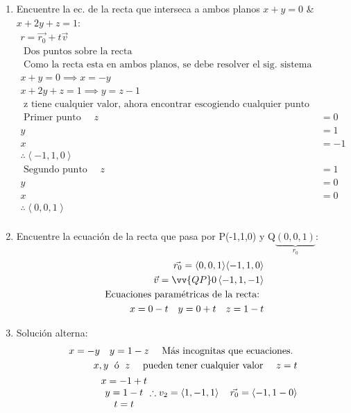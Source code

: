 \documentclass{article}
\begin{document}
\begin{enumerate}
    \item Encuentre la ec. de la recta que interseca a ambos planos $x+y=0$ \& $x+2y+z=1$: 
        \begin{align*}
            r = \vec{r_0} + t \vec{v} \\ 
            \text{  Dos puntos sobre la recta  } \\ 
            \text{  Como la recta esta en ambos planos, se debe resolver el sig. sistema de ecuaciones  } \\ 
            x + y = 0 \implies x=-y \\ 
            x+2y+z=1 \implies y = z-1 \\ 
            \text{  z tiene cualquier valor, ahora encontrar escogiendo cualquier punto sobre la recta, en este caso 0   } \\ 
            \text{  Primer punto   } \quad z & = 0 \\
            y &= 1\\ 
            x & = -1 \\ 
            \therefore \left\langle -1,1,0 \right\rangle \\ 
            \text{  Segundo punto  } \quad z &= 1 \\ 
            y & = 0 \\ 
            x & = 0 \\ 
            \therefore \left\langle 0,0,1 \right\rangle \\ 
        \end{align*}
    
    \item Encuentre la ecuación de la recta que pasa por P(-1,1,0) y Q$\underbrace{(0,0,1)}_{r_0}$:
        \begin{align*}
            \vec{r_0} = \left\langle 0,0,1 \right\rangle \! \left\langle -1,1,0 \right\rangle \\ 
            \vec{v} = \vv{QP} 0 \left\langle -1,1,-1 \right\rangle \\ 
            \text{  Ecuaciones paramétricas de la recta:  } \\ 
            x = 0-t \quad y = 0 + t \quad z = 1-t \\ 
        \end{align*}
    
    \item Solución alterna:
        \begin{align*}
            x = -y \quad y = 1-z \quad \text{  Más incognitas que ecuaciones.  }\\
            x,y \; \text{  ó   }\; z \text{  \quad pueden tener cualquier valor  } \quad z=t \\ 
            \begin{matrix}
                x = -1 + t \\ 
                y = 1 - t \\ 
                t = t \\ 
            \end{matrix} \therefore v_2 = \left\langle 1,-1,1 \right\rangle  \quad \vec{r_0} = \left\langle -1,1-0 \right\rangle \\ 
        \end{align*}
    

\end{enumerate}
\end{document}
